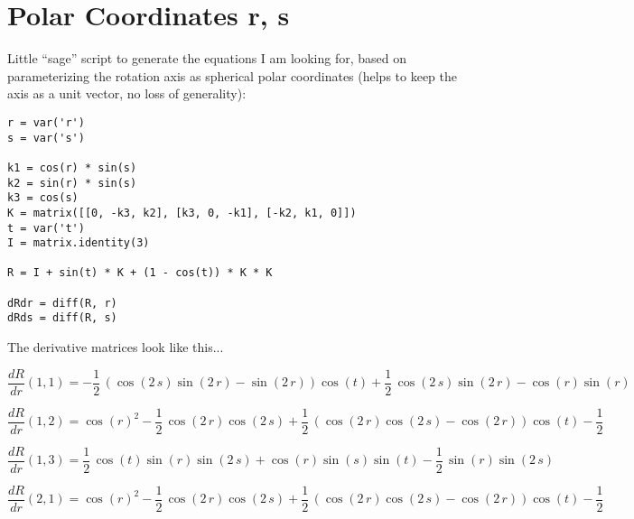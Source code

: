 \documentclass[a4paper,11pt]{article}
\begin{document}
\section{Polar Coordinates r, s}

Little ``sage'' script to generate the equations I am looking for, based on 
parameterizing the rotation axis as spherical polar coordinates (helps to keep
the axis as a unit vector, no loss of generality):

{\small
\begin{verbatim}
r = var('r')
s = var('s')

k1 = cos(r) * sin(s)
k2 = sin(r) * sin(s)
k3 = cos(s)
K = matrix([[0, -k3, k2], [k3, 0, -k1], [-k2, k1, 0]])
t = var('t')
I = matrix.identity(3)

R = I + sin(t) * K + (1 - cos(t)) * K * K

dRdr = diff(R, r)
dRds = diff(R, s)
\end{verbatim}
}

The derivative matrices look like this...

\begin{equation}
\frac{dR}{dr}(1,1)=-\frac{1}{2} \, {\left(\cos\left(2 \, s\right) \sin\left(2 \, r\right) - \sin\left(2 \, r\right)\right)} \cos\left(t\right) + \frac{1}{2} \, \cos\left(2 \, s\right) \sin\left(2 \, r\right) - \cos\left(r\right) \sin\left(r\right)
\end{equation}

\begin{equation}
\frac{dR}{dr}(1,2)=\cos\left(r\right)^{2} - \frac{1}{2} \, \cos\left(2 \, r\right) \cos\left(2 \, s\right) + \frac{1}{2} \, {\left(\cos\left(2 \, r\right) \cos\left(2 \, s\right) - \cos\left(2 \, r\right)\right)} \cos\left(t\right) - \frac{1}{2}
\end{equation}

\begin{equation}
\frac{dR}{dr}(1,3)=\frac{1}{2} \, \cos\left(t\right) \sin\left(r\right) \sin\left(2 \, s\right) + \cos\left(r\right) \sin\left(s\right) \sin\left(t\right) - \frac{1}{2} \, \sin\left(r\right) \sin\left(2 \, s\right)
\end{equation}

\begin{equation}
\frac{dR}{dr}(2,1)=\cos\left(r\right)^{2} - \frac{1}{2} \, \cos\left(2 \, r\right) \cos\left(2 \, s\right) + \frac{1}{2} \, {\left(\cos\left(2 \, r\right) \cos\left(2 \, s\right) - \cos\left(2 \, r\right)\right)} \cos\left(t\right) - \frac{1}{2}
\end{equation}
\end{document}
